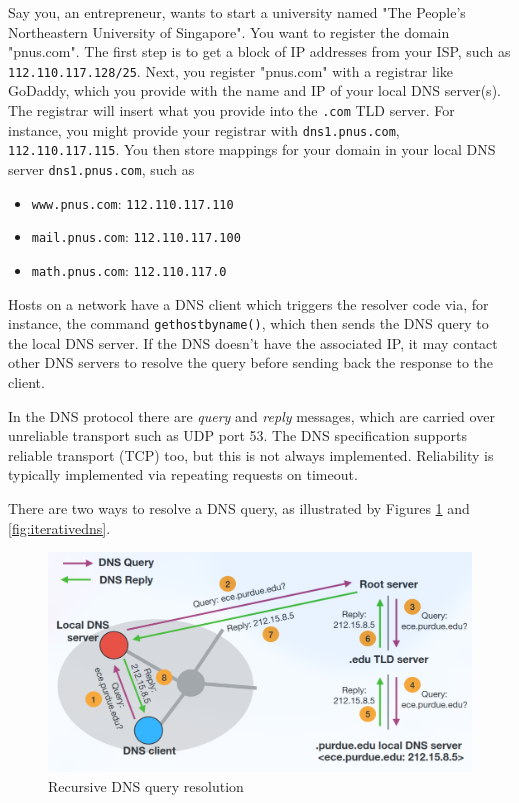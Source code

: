 Say you, an entrepreneur, wants to start a university named
"The People's Northeastern University of Singapore".
You want to register the domain "pnus.com". The first step
is to get a block of IP addresses from your ISP, such as
\texttt{112.110.117.128/25}. Next, you register "pnus.com"
with a registrar like GoDaddy, which you provide with the
name and IP of your local DNS server(s). The registrar
will insert what you provide into the \texttt{.com} TLD
server. For instance, you might provide your registrar with
\texttt{dns1.pnus.com}, \texttt{112.110.117.115}. You
then store mappings for your domain in your local DNS server
\texttt{dns1.pnus.com}, such as
\begin{itemize}
    \item \texttt{www.pnus.com}: \texttt{112.110.117.110}
    \item \texttt{mail.pnus.com}: \texttt{112.110.117.100}
    \item \texttt{math.pnus.com}: \texttt{112.110.117.0}
\end{itemize}

Hosts on a network have a DNS client which triggers the resolver
code via, for instance, the command \texttt{gethostbyname()},
which then sends the DNS query to the local DNS server. If the
DNS doesn't have the associated IP, it may contact other DNS
servers to resolve the query before sending back the response
to the client.

In the DNS protocol there are \emph{query} and \emph{reply}
messages, which are carried over unreliable transport
such as UDP port 53. The DNS specification supports reliable
transport (TCP) too, but this is not always implemented.
Reliability is typically implemented via repeating requests
on timeout.

There are two ways to resolve a DNS query, as illustrated
by Figures \ref{fig:recursivedns} and \ref{fig:iterativedns}.

\begin{figure}
    \includegraphics{images/recursivedns.png}
    \caption{Recursive DNS query resolution}
    \label{fig:recursivedns}
\end{figure}

